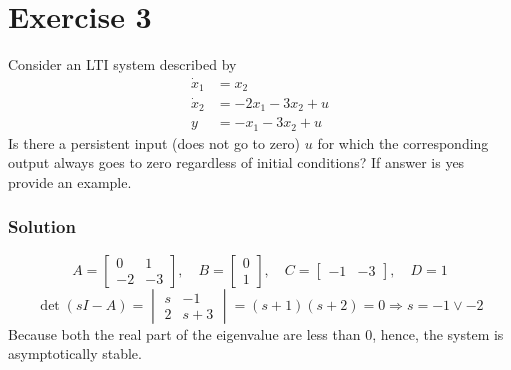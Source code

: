 \documentclass[12pt,a4paper]{article}
\begin{document}
	\section*{Exercise 3}
	Consider an LTI system described by
	\begin{align*}
		\dot{x}_{1} &= x_{2} \\
		\dot{x}_{2} &= -2x_{1}-3x_{2}+u \\
		y &= -x_{1}-3x_{2}+u
	\end{align*}
	Is there a persistent input (does not go to zero) $u$ for which the corresponding output always goes to zero regardless of initial conditions? If answer is yes provide an example.
	
	\subsubsection*{Solution}
	
	\[
	A = \begin{bmatrix}
		0 & 1  \\ -2 & -3
	\end{bmatrix}, \quad B = \begin{bmatrix}
	0 \\ 1
	\end{bmatrix}, \quad C = \begin{bmatrix}
	-1 & -3
	\end{bmatrix}, \quad D = 1
	\]
	\[
	\det (sI - A) = \begin{vmatrix}
		s & -1 \\ 2 & s + 3
	\end{vmatrix} = (s + 1)(s + 2) = 0 \Rightarrow s = -1 \lor -2
	\]
	Because both the real part of the eigenvalue are less than $0$, hence, the system is asymptotically stable.
	
\end{document}
